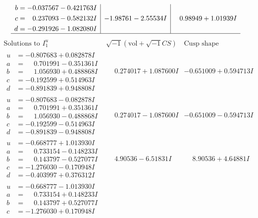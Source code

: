 \documentclass[1p]{elsarticle_modified}
\theoremstyle{definition}
\newcommand{\I}{\sqrt{-1}}
\begin{document}
$$\begin{array}{c|c|c}
\begin{aligned}
b &= -0.037567 - 0.421763 I \\
c &= \phantom{-}0.237093 - 0.582132 I \\
d &= -0.291926 - 1.082080 I\end{aligned}
 & -1.98761 - 2.55534 I & \phantom{-}0.98949 + 1.01939 I\\
 \hline 
 \end{array}$$\newpage$$\begin{array}{c|c|c}  
\text{Solutions to }I^u_{1}& \I (\text{vol} + \sqrt{-1}CS) & \text{Cusp shape}\\
 \hline 
\begin{aligned}
u &= -0.807683 + 0.082878 I \\
a &= \phantom{-}0.701991 - 0.351361 I \\
b &= \phantom{-}1.056930 + 0.488868 I \\
c &= -0.192599 + 0.514963 I \\
d &= -0.891839 + 0.948808 I\end{aligned}
 & \phantom{-}0.274017 + 1.087600 I & -0.651009 + 0.594713 I \\ \hline\begin{aligned}
u &= -0.807683 - 0.082878 I \\
a &= \phantom{-}0.701991 + 0.351361 I \\
b &= \phantom{-}1.056930 - 0.488868 I \\
c &= -0.192599 - 0.514963 I \\
d &= -0.891839 - 0.948808 I\end{aligned}
 & \phantom{-}0.274017 - 1.087600 I & -0.651009 - 0.594713 I \\ \hline\begin{aligned}
u &= -0.668777 + 1.013930 I \\
a &= \phantom{-}0.733154 - 0.148233 I \\
b &= \phantom{-}0.143797 - 0.527077 I \\
c &= -1.276030 - 0.170948 I \\
d &= -0.403997 + 0.376312 I\end{aligned}
 & \phantom{-}4.90536 - 6.51831 I & \phantom{-}8.90536 + 4.64881 I \\ \hline\begin{aligned}
u &= -0.668777 - 1.013930 I \\
a &= \phantom{-}0.733154 + 0.148233 I \\
b &= \phantom{-}0.143797 + 0.527077 I \\
c &= -1.276030 + 0.170948 I \\

\end{aligned}
\end{array}$$
\end{document}
